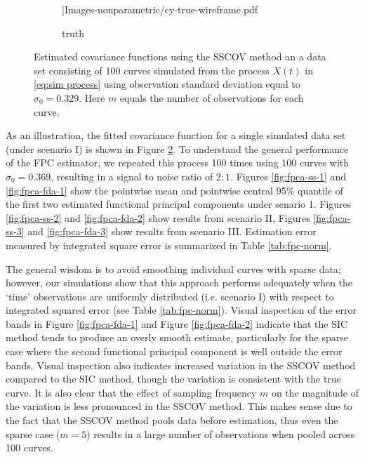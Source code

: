 \begin{figure}
\begin{subfigure}
		\textwidth]{Images-nonparametric/cy-true-wireframe.pdf} \caption{truth} \label{} 
	\end{subfigure}
	\caption{Estimated covariance functions using the SSCOV method an a data set consisting of 100 curves simulated from the process $X(t)$ in \eqref{eq:sim process} using observation standard deviation equal to $\sigma_0 = 0.329$. Here $m$ equals the number of observations for each curve. } \label{fig:covfits} 
\end{figure}

As an illustration, the fitted covariance function for a single simulated data set (under scenario I) is shown in Figure \ref{fig:covfits}. To understand the general performance of the FPC estimator, we repeated this process 100 times using 100 curves with $\sigma_0=0.369$, resulting in a signal to noise ratio of $2:1$. Figures \ref{fig:fpca-ss-1} and \ref{fig:fpca-fda-1} show the pointwise mean and pointwise central 95\% quantile of the first two estimated functional principal components under senario 1. Figures \ref{fig:fpca-ss-2} and \ref{fig:fpca-fda-2} show results from scenario II, Figures \ref{fig:fpca-ss-3} and \ref{fig:fpca-fda-3} show results from scenario III. Estimation error measured by integrated square error is summarized in Table \ref{tab:fpc-norm}. 

The general wisdom is to avoid smoothing individual curves with sparse data; however, our simulations show that this approach performs adequately when the `time' observations are uniformly distributed (i.e. scenario I) with respect to integrated squared error (see Table \ref{tab:fpc-norm}). Visual inspection of the error bands in Figure \ref{fig:fpca-fda-1} and Figure \ref{fig:fpca-fda-2} indicate that the SIC method tends to produce an overly smooth estimate, particularly for the sparse case where the second functional principal component is well outside the error bands. Visual inspection also indicates increased variation in the SSCOV method compared to the SIC method, though the variation is consistent with the true curve. It is also clear that the effect of sampling frequency $m$ on the magnitude of the variation is less pronounced in the SSCOV method. This makes sense due to the fact that the SSCOV method pools data before estimation, thus even the sparse case ($m = 5$) results in a large number of observations when pooled across 100 curves. 

